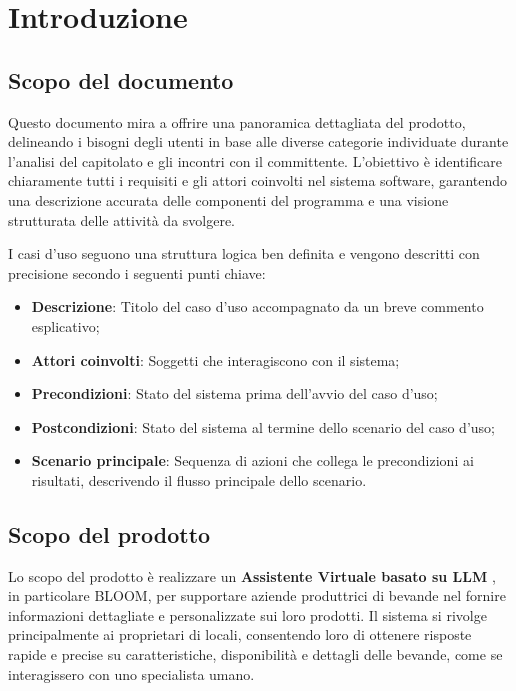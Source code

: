 \section{Introduzione}

\subsection{Scopo del documento}
Questo documento mira a offrire una panoramica dettagliata del prodotto, 
delineando i bisogni degli utenti in base alle diverse categorie individuate durante 
l'analisi del capitolato e gli incontri con il committente.
L'obiettivo è identificare chiaramente tutti i requisiti e gli attori coinvolti
nel sistema software, garantendo una descrizione accurata delle componenti del programma
e una visione strutturata delle attività da svolgere. 

I casi d’uso seguono una struttura logica ben definita e vengono descritti 
con precisione secondo i seguenti punti chiave:

\begin{itemize}
    \item \textbf{Descrizione}: Titolo del caso d’uso accompagnato da un breve commento esplicativo;
    \item \textbf{Attori coinvolti}: Soggetti che interagiscono con il sistema;
    \item \textbf{Precondizioni}: Stato del sistema prima dell’avvio del caso d’uso;
    \item \textbf{Postcondizioni}: Stato del sistema al termine dello scenario del caso d’uso;
    \item \textbf{Scenario principale}: Sequenza di azioni che collega le precondizioni ai risultati, descrivendo il flusso principale dello scenario.
\end{itemize}

\subsection{Scopo del prodotto}
Lo scopo del prodotto è realizzare un \textbf{Assistente Virtuale basato su LLM }, 
in particolare BLOOM, per supportare aziende produttrici di bevande nel fornire 
informazioni dettagliate e personalizzate sui loro prodotti. 
Il sistema si rivolge principalmente ai proprietari di locali, 
consentendo loro di ottenere risposte rapide e precise su caratteristiche, 
disponibilità e dettagli delle bevande, come se interagissero con uno specialista umano.


